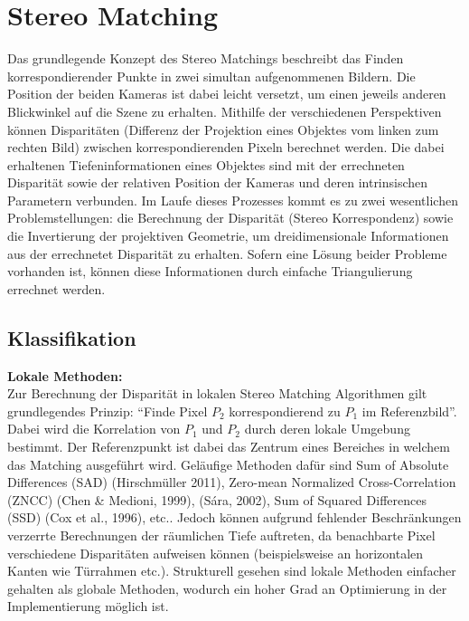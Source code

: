 \section{Stereo Matching}
\label{sec:stereo_matching}
Das grundlegende Konzept des Stereo Matchings beschreibt das Finden korrespondierender Punkte in zwei simultan aufgenommenen Bildern. Die Position der beiden Kameras ist dabei leicht versetzt, um einen jeweils anderen Blickwinkel auf die Szene zu erhalten. Mithilfe der verschiedenen Perspektiven können Disparitäten (Differenz der Projektion eines Objektes vom linken zum rechten Bild) zwischen korrespondierenden Pixeln berechnet werden. Die dabei erhaltenen Tiefeninformationen eines Objektes sind mit der errechneten Disparität sowie der relativen Position der Kameras und deren intrinsischen Parametern verbunden.
Im Laufe dieses Prozesses kommt es zu zwei wesentlichen Problemstellungen: die Berechnung der Disparität (Stereo Korrespondenz) sowie die Invertierung der projektiven Geometrie, um dreidimensionale Informationen aus der errechnetet Disparität zu erhalten. Sofern eine Lösung beider Probleme vorhanden ist, können diese Informationen durch einfache Triangulierung errechnet werden.

\subsection{Klassifikation}
\label{subsec:stereo_matching_classification}
\textbf{Lokale Methoden:}\\
Zur Berechnung der Disparität in lokalen Stereo Matching Algorithmen gilt grundlegendes Prinzip: “Finde Pixel $P_2$ korrespondierend zu $P_1$ im Referenzbild”. Dabei wird die Korrelation von $P_1$ und $P_2$ durch deren lokale Umgebung bestimmt. Der Referenzpunkt ist dabei das Zentrum eines Bereiches in welchem das Matching ausgeführt wird. Geläufige Methoden dafür sind Sum of Absolute Differences (SAD) (Hirschmüller 2011), Zero-mean Normalized Cross-Correlation (ZNCC) (Chen \& Medioni, 1999), (Sára, 2002), Sum of Squared Differences (SSD) (Cox et al., 1996), etc..
Jedoch können aufgrund fehlender Beschränkungen verzerrte Berechnungen der räumlichen Tiefe auftreten, da benachbarte Pixel verschiedene Disparitäten aufweisen können (beispielsweise an horizontalen Kanten wie Türrahmen etc.). Strukturell gesehen sind lokale Methoden einfacher gehalten als globale Methoden, wodurch ein hoher Grad an Optimierung in der Implementierung möglich ist.\\

